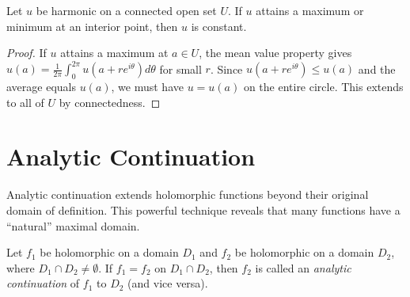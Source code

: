 \begin{center}
\end{center}

\begin{theorem}
  Let $u$ be harmonic on a connected open set $U$. If $u$ attains a maximum or minimum at an interior point, then $u$ is constant.
\end{theorem}

\begin{proof}
  If $u$ attains a maximum at $a \in U$, the mean value property gives $u(a) = \frac{1}{2\pi} \int_0^{2\pi} u(a + re^{i\theta}) d\theta$ for small $r$. Since $u(a + re^{i\theta}) \leq u(a)$ and the average equals $u(a)$, we must have $u = u(a)$ on the entire circle. This extends to all of $U$ by connectedness.
\end{proof}

\section{Analytic Continuation}

Analytic continuation extends holomorphic functions beyond their original domain of definition. This powerful technique reveals that many functions have a ``natural'' maximal domain.

\begin{definition}
  Let $f_1$ be holomorphic on a domain $D_1$ and $f_2$ be holomorphic on a domain $D_2$, where $D_1 \cap D_2 \neq \emptyset$.
  If $f_1 = f_2$ on $D_1 \cap D_2$, then $f_2$ is called an \emph{analytic continuation} of $f_1$ to $D_2$ (and vice versa).
\end{definition}

